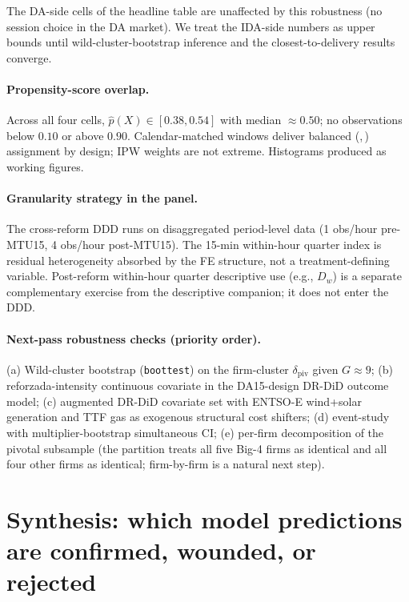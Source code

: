 \documentclass[11pt,a4paper]{article}
\newcommand{\code}[1]{\nolinkurl{#1}}
\begin{document}


The DA-side cells of the headline table are unaffected by this robustness (no session choice in the DA market). We treat the IDA-side numbers as upper bounds until wild-cluster-bootstrap inference and the closest-to-delivery results converge.

\paragraph{Propensity-score overlap.} Across all four cells, $\hat p(X) \in [0.38, 0.54]$ with median $\approx 0.50$; no observations below $0.10$ or above $0.90$. Calendar-matched windows deliver balanced (,\,) assignment by design; IPW weights are not extreme. Histograms produced as working figures.

\paragraph{Granularity strategy in the panel.} The cross-reform DDD runs on disaggregated period-level data (1 obs/hour pre-MTU15, 4 obs/hour post-MTU15). The 15-min within-hour quarter index is residual heterogeneity absorbed by the FE structure, not a treatment-defining variable. Post-reform within-hour quarter descriptive use (e.g., $D_w$) is a separate complementary exercise from the descriptive companion; it does not enter the DDD.

\paragraph{Next-pass robustness checks (priority order).} (a) Wild-cluster bootstrap (\code{boottest}) on the firm-cluster $\delta_{\text{piv}}$ given $G \approx 9$; (b) reforzada-intensity continuous covariate in the DA15-design DR-DiD outcome model; (c) augmented DR-DiD covariate set with ENTSO-E wind+solar generation and TTF gas as exogenous structural cost shifters; (d) event-study with multiplier-bootstrap simultaneous CI; (e) per-firm decomposition of the pivotal subsample (the partition treats all five Big-4 firms as identical and all four other firms as identical; firm-by-firm is a natural next step).

\section{Synthesis: which model predictions are confirmed, wounded, or rejected}\label{sec:ident:synthesis}
\end{document}
